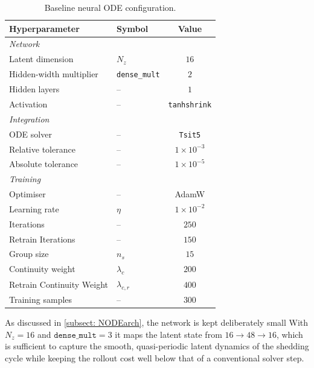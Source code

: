 \begin{table}[H]
    \centering
    \begin{tabular}{@{}llc@{}}
        \toprule
        Hyperparameter & Symbol & Value \\
        \midrule
        \multicolumn{3}{l}{\textit{Network}} \\
        Latent dimension          & $N_z$                & $16$ \\
        Hidden-width multiplier   & \texttt{dense\_mult} & $2$  \\ %
        Hidden layers             & --                   & $1$  \\
        Activation                & --                   & \texttt{tanhshrink} \\
        \midrule
        \multicolumn{3}{l}{\textit{Integration}} \\
        ODE solver                & --                   & \texttt{Tsit5} \\
        Relative tolerance        & --                   & $1\times10^{-3}$ \\
        Absolute tolerance        & --                   & $1\times10^{-5}$ \\
        \midrule
        \multicolumn{3}{l}{\textit{Training}} \\
        Optimiser                 & --                   & AdamW \\
        Learning rate             & $\eta$               & $1\times10^{-2}$ \\
        Iterations                & --                   & $250$ \\
        Retrain Iterations        & --                   & $150$ \\
        Group size                & $n_s$                & $15$  \\
        Continuity weight         & $\lambda_c$          & $200$ \\
        Retrain Continuity Weight & $\lambda_{c, r}$     & $400$ \\
        Training samples          & --                   & $300$ \\
        \bottomrule
    \end{tabular}
    \caption{Baseline neural ODE configuration.}
    \label{tab: 4_node_config}
\end{table}

As discussed in \ref{subsect: NODEarch}, the network is kept deliberately small With $N_z = 16$ and $\texttt{dense\_mult}=3$ it maps the latent state from $16 \to 48 \to 16$, which is sufficient to capture the smooth, quasi-periodic latent dynamics of the shedding cycle while keeping the rollout cost well below that of a conventional solver step. 

